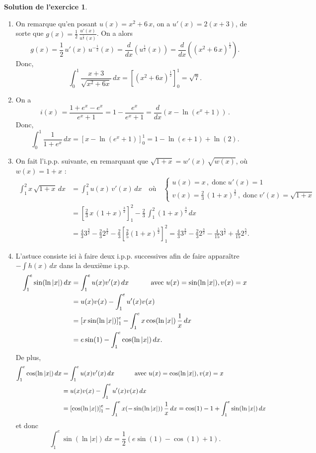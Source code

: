 \documentclass[a4paper, 11pt,openany]{article}%
\theoremstyle{plain}
\theoremstyle{definition}
\newtheorem{sol}{Solution de l'exercice}
\theoremstyle{remark}
\begin{document}
\begin{sol}
\begin{enumerate}
\item On remarque qu'en posant $u(x)=x^2+6\,x$, on a $u'(x)=2(x+3)$, de sorte que
$g(x)=\frac{1}{2}\,\frac{u'(x)}{u^{\frac{1}{2}}(x)}$. On a alors 
\[
g(x)= \frac{1}{2}\,
u'(x)\,u^{-\frac{1}{2}}(x)=\frac{d}{dx} \left( u^{\frac{1}{2}}(x)\right)
=\frac{d}{dx} \left( (x^2+6\,x)^{\frac{1}{2}}\right).
\]
Donc,
\[ \int_0^1  \frac{x+3}{\sqrt{x^2 + 6x}} \, dx = \left[ (x^2 + 6x)^{\frac{1}{2}} \right]_0^1 = \sqrt{7}.\]
\item On a 
\[
i(x)\,  = \frac{1+e^{x}-e^{x}}{e^{x}+1}=1-\frac{e^{x}}{e^{x}+1}=\frac{d}{dx}\left(x-\ln (e^{x}+1)\right)\,.
\]
Donc,
\[ \int_0^1  \frac{1}{1+e^x} \, dx = \left[ x - \ln(e^x +1 ) \right]_0^1 = 1 - \ln(e+1) + \ln(2).\]
\item On fait l'i.p.p. suivante, en remarquant que $\sqrt{1+x}=w'(x)\,\sqrt{w(x)}$, où $w(x)=1+x$ :
\begin{align*}
\int_1^2 x\,\sqrt{1+x}\, dx &= \int_1^2 u(x)\, v'(x)\, dx \quad \text{où}\quad \begin{cases}
 u(x)=x\,,\;\text{donc}\; u'(x)=1\\
 v(x)=\frac{2}{3}\,(1+x)^{\frac{3}{2}}\,,\;\text{donc}\;v'(x)=\sqrt{1+x}\end{cases}\\
&= \left[ \frac{2}{3}\,x\, (1+x)^{\frac{3}{2}} \right]_1^2-\frac{2}{3}\,\int_1^2(1+x)^{\frac{3}{2}}\,dx\\
&= \frac{4}{3}3^{\frac{3}{2}} - \frac{2}{3}2^{\frac{3}{2}} - \frac{2}{3}  \left[ \frac{2}{5} (1+x)^{\frac{5}{2}} \right]_1^2 = \frac{4}{3}3^{\frac{3}{2}} - \frac{2}{3}2^{\frac{3}{2}} - \frac{4}{15}3^{\frac{5}{2}} + \frac{4}{15} 2^{\frac{5}{2}}.
\end{align*}
\item L'astuce consiste ici à faire deux i.p.p. successives afin de faire apparaître $-\int h(x)\,dx$ dans la deuxième i.p.p.
\begin{align*}
  \int_1^e  \sin(\ln|x|)\, dx &= \int_1^e  u(x) v'(x)\, dx\mbox{\hspace{1cm} avec } u(x)=\sin(\ln|x|), v(x)=x\\
&= u(x) v(x) - \int_1^e   u'(x) v(x)\\
  &= \left[ x \sin(\ln|x|)  \right]_1^e  - \int_1^e  x \cos(\ln|x|) \, \frac{1}{x}\, dx \\
  &= e \sin(1) -\int_1^e  \cos(\ln|x|)\, dx.
\end{align*}
De plus,
\begin{align*}
  \int_1^e  \cos(\ln|x|)\, dx &= \int_1^e  u(x) v'(x)\, dx 
\mbox{\hspace{1cm} avec } u(x)=\cos(\ln|x|),v(x)=x\\
&= u(x) v(x) 
- \int_1^e  u'(x) v(x)\, dx \\
&= \left[ \cos(\ln|x|)\right]_1^e - \int_1^e  x (-\sin(\ln|x|)) \, \frac{1}{x}\, dx
= \cos(1)-1 +\int_1^e \sin(\ln|x|)\, dx
\end{align*}
et donc
\[
\int_1^e \sin(\ln|x|)\, dx = \frac{1}{2}(e \sin(1) - \cos(1)+1 ).
\]
\end{enumerate}
\end{sol}
\end{document}
